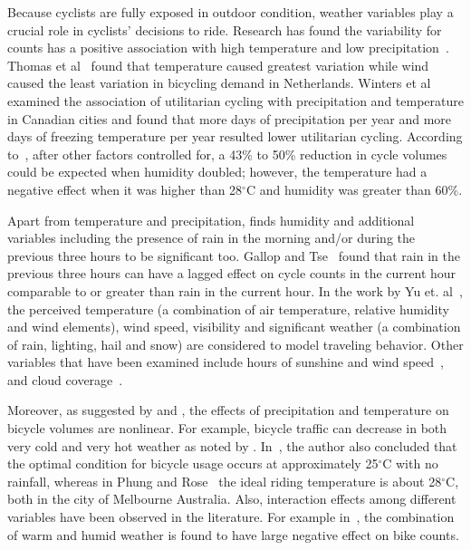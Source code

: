 \documentclass [11pt, proquest] {uwthesis}[2015/03/03]
\begin{document}
Because cyclists are fully exposed in outdoor condition, weather variables play a crucial role in cyclists' decisions to ride. Research has found the variability for counts has a positive association with high temperature and low precipitation~\cite{Niemeier:1996aa,Parkin:2008aa}. Thomas et al~\cite{Thomas:2009aa} found that temperature caused greatest variation while wind caused the least variation in bicycling demand in Netherlands. Winters et al~\cite{Winters07} examined the association of utilitarian cycling with precipitation and temperature in Canadian cities and found that more days of precipitation per year and more days of freezing temperature per year resulted lower utilitarian cycling. According to~\cite{Miranda-Moreno:2011aa}, after other factors controlled for, a 43\% to 50\% reduction in cycle volumes could be expected when humidity doubled; however, the temperature had a negative effect when it was higher than 28$^\circ$C and humidity was greater than 60\%.

Apart from temperature and precipitation, \cite{Miranda-Moreno:2011aa} finds humidity and additional variables including the presence of rain in the morning and/or during the previous three hours to be significant too. Gallop and Tse~\cite{Gallop:2012aa} found that rain in the previous three hours can have a lagged effect on cycle counts in the current hour comparable to or greater than rain in the current hour. In the work by Yu et. al~\cite{Yu09}, the perceived temperature (a combination of air temperature, relative humidity and wind elements), wind speed, visibility and significant weather (a combination of rain, lighting, hail and snow) are considered to model traveling behavior. Other variables that have been examined include hours of sunshine and wind speed~\cite{Thomas12}, and cloud coverage~\cite{Hanson77}.

Moreover, as suggested by \cite{Lewin:2011aa} and \cite{Thomas:2009aa}, the effects of precipitation and temperature on bicycle volumes are nonlinear. For example, bicycle traffic can decrease in both very cold and very hot weather as noted by \cite{Richardson:2000aa}. In~\cite{Richardson:2000aa}, the author also concluded that the optimal condition for bicycle usage occurs at approximately 25$^\circ$C with no rainfall, whereas in Phung and Rose~\cite{Rose07} the ideal riding temperature is about 28$^\circ$C, both in the city of Melbourne Australia. Also, interaction effects among different variables have been observed in the literature. For example in~\cite{Miranda-Moreno:2011aa}, the combination of warm and humid weather is found to have large negative effect on bike counts.
\end{document}
